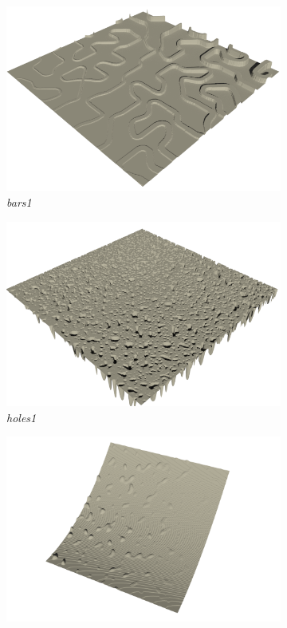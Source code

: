 \documentclass[../document.tex]{subfiles}
\begin{document}
\begin{figure}[H]
    \centering
        \begin{subfigure}[b]{0.45\textwidth}
            \includegraphics[width=\textwidth]{../img/rendered/1.png}
            \caption{\emph{bars1}}
        \end{subfigure}
        \begin{subfigure}[b]{0.45\linewidth}
            \includegraphics[width=\textwidth]{../img/rendered/2.png}
            \caption{\emph{holes1}}
            \end{subfigure}    
          \begin{subfigure}[b]{0.45\textwidth}
            \includegraphics[width=\textwidth]{../img/rendered/3.png}

\end{subfigure}
\end{figure}
\end{document}
